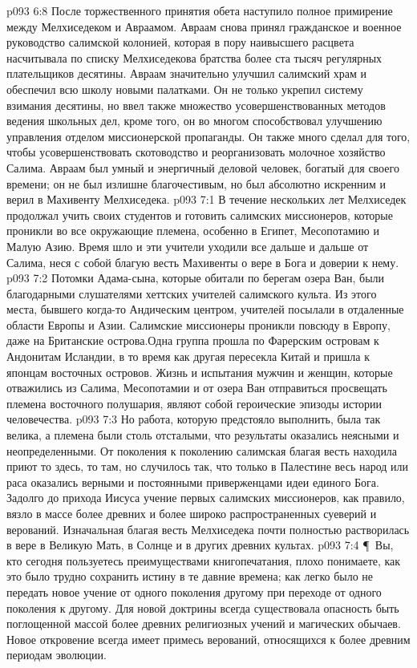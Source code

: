 \vs p093 6:8 После торжественного принятия обета наступило полное примирение между Мелхиседеком и Авраамом. Авраам снова принял гражданское и военное руководство салимской колонией, которая в пору наивысшего расцвета насчитывала по списку Мелхиседекова братства более ста тысяч регулярных плательщиков десятины. Авраам значительно улучшил салимский храм и обеспечил всю школу новыми палатками. Он не только укрепил систему взимания десятины, но ввел также множество усовершенствованных методов ведения школьных дел, кроме того, он во многом способствовал улучшению управления отделом миссионерской пропаганды. Он также много сделал для того, чтобы усовершенствовать скотоводство и реорганизовать молочное хозяйство Салима. Авраам был умный и энергичный деловой человек, богатый для своего времени; он не был излишне благочестивым, но был абсолютно искренним и верил в Махивенту Мелхиседека.
\vs p093 7:1 В течение нескольких лет Мелхиседек продолжал учить своих студентов и готовить салимских миссионеров, которые проникли во все окружающие племена, особенно в Египет, Месопотамию и Малую Азию. Время шло и эти учители уходили все дальше и дальше от Салима, неся с собой благую весть Махивенты о вере в Бога и доверии к нему.
\vs p093 7:2 Потомки Адама\hyp{}сына, которые обитали по берегам озера Ван, были благодарными слушателями хеттских учителей салимского культа. Из этого места, бывшего когда\hyp{}то Андическим центром, учителей посылали в отдаленные области Европы и Азии. Салимские миссионеры проникли повсюду в Европу, даже на Британские острова.Одна группа прошла по Фарерским островам к Андонитам Исландии, в то время как другая пересекла Китай и пришла к японцам восточных островов. Жизнь и испытания мужчин и женщин, которые отважились из Салима, Месопотамии и от озера Ван отправиться просвещать племена восточного полушария, являют собой героические эпизоды истории человечества.
\vs p093 7:3 Но работа, которую предстояло выполнить, была так велика, а племена были столь отсталыми, что результаты оказались неясными и неопределенными. От поколения к поколению салимская благая весть находила приют то здесь, то там, но случилось так, что только в Палестине весь народ или раса оказались верными и постоянными приверженцами идеи единого Бога. Задолго до прихода Иисуса учение первых салимских миссионеров, как правило, вязло в массе более древних и более широко распространенных суеверий и верований. Изначальная благая весть Мелхиседека почти полностью растворилась в вере в Великую Мать, в Солнце и в других древних культах.
\vs p093 7:4 \P\ Вы, кто сегодня пользуетесь преимуществами книгопечатания, плохо понимаете, как это было трудно сохранить истину в те давние времена; как легко было не передать новое учение от одного поколения другому при переходе от одного поколения к другому. Для новой доктрины всегда существовала опасность быть поглощенной массой более древних религиозных учений и магических обычаев. Новое откровение всегда имеет примесь верований, относящихся к более древним периодам эволюции.
